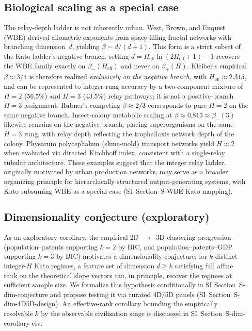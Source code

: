 \subsection{Biological scaling as a special case}\label{subsec:biological_scaling}
The relay-depth ladder is not inherently urban. West, Brown, and Enquist
(WBE) derived allometric exponents from space-filling fractal networks with
branching dimension~$d$, yielding $\beta=d/(d+1)$. This form is a strict
subset of the Kato ladder's negative branch: setting
$d=H_{\mathrm{eff}}\ln(2H_{\mathrm{eff}}+1)-1$ recovers the WBE family exactly
on $\beta_{-}(H_{\mathrm{eff}})$ and never on $\beta_{+}(H)$. Kleiber's
empirical $\beta\approx 3/4$ is therefore realized \emph{exclusively on the
negative branch}, with $H_{\mathrm{eff}}\approx 2.315$, and can be represented
to integer-rung accuracy by a two-component mixture of $H=2$ ($56.5\%$) and
$H=3$ ($43.5\%$) relay pathways; it is not a positive-branch $H=3$
assignment. Rubner's competing $\beta\approx 2/3$ corresponds to pure $H=2$
on the same negative branch. Insect-colony metabolic scaling at
$\beta\approx 0.813\approx\beta_{-}(3)$ likewise remains on the negative
branch, placing superorganisms on the same $H=3$ rung, with relay depth
reflecting the trophallaxis network depth of the colony. Physarum
polycephalum (slime-mold) transport networks yield $H\approx 2$ when
evaluated via directed Kirchhoff index, consistent with a single-relay
tubular architecture. These examples suggest that the
integer relay ladder, originally motivated by urban production networks, may
serve as a broader organizing principle for hierarchically structured
output-generating systems, with Kato subsuming WBE as a special case
(SI~Section~\textsf{S-WBE-Kato-mapping}).

\subsection{Dimensionality conjecture (exploratory)}\label{subsec:dim_conjecture}
As an exploratory corollary, the empirical 2D~$\to$~3D clustering progression
(population--patents supporting $k=2$ by BIC, and
population--patents--GDP supporting $k=3$ by BIC) motivates a dimensionality
conjecture: for $k$ distinct integer-$H$ Kato regimes, a feature set of
dimension $d\geq k$ satisfying full affine rank on the theoretical slope
vectors can, in principle, recover the regimes at sufficient sample size.
We formalize this hypothesis conditionally in SI
Section~\textsf{S-dim-conjecture} and propose testing it via curated 4D/5D
panels (SI~Section~\textsf{S-dim-4D5D-design}). An effective-rank corollary
bounding the empirically resolvable $k$ by the observable civilization stage
is discussed in SI~Section~\textsf{S-dim-corollary-civ}.

